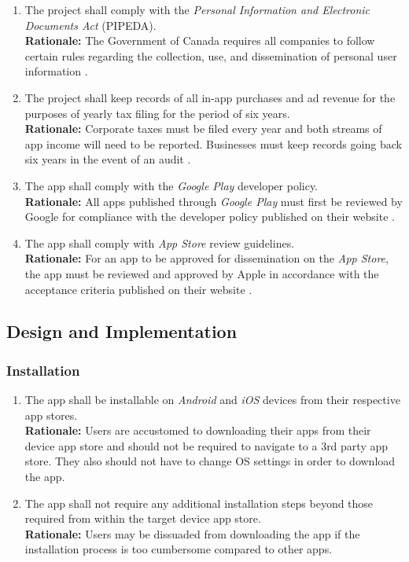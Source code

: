 \documentclass{article}
\begin{document}
\begin{enumerate}[align=left, label=\textbf{CO\arabic*.}]
    \item The project shall comply with the \emph{Personal Information and Electronic Documents Act} (PIPEDA).\\
    {\bf Rationale:} The Government of Canada requires all companies to follow certain rules regarding the collection, use, and dissemination of personal user information \cite{PIPEDA}.
    \item The project shall keep records of all in-app purchases and ad revenue for the purposes of yearly tax filing for the period of six years.\\
    {\bf Rationale:} Corporate taxes must be filed every year and both streams of app income will need to be reported. Businesses must keep records going back six years in the event of an audit \cite{6Year}.
    \item The app shall comply with the \emph{Google Play} developer policy.\\
    {\bf Rationale:} All apps published through \emph{Google Play} must first be reviewed by Google for compliance with the developer policy published on their website \cite{GooglePlay}.
    \item The app shall comply with \emph{App Store} review guidelines.\\
    {\bf Rationale:} For an app to be approved for dissemination on the \emph{App Store}, the app must be reviewed and approved by Apple in accordance with the acceptance criteria published on their website \cite{AppStore}.
\end{enumerate}

\subsection{Design and Implementation}

\subsubsection{Installation}
\label{ssub:installation}


\begin{enumerate}[align=left, label=\textbf{DI-I\arabic*.}]
    \item The app shall be installable on \emph{Android} and \emph{iOS} devices from their respective app stores.\\
    {\bf Rationale:} Users are accustomed to downloading their apps from their device app store and should not be required to navigate to a 3rd party app store. They also should not have to change OS settings in order to download the app.
    \item The app shall not require any additional installation steps beyond those required from within the target device app store.\\
    {\bf Rationale:} Users may be dissuaded from downloading the app if the installation process is too cumbersome compared to other apps.
\end{enumerate}
\end{document}
